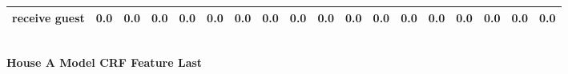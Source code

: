 \documentclass{article}
\begin{document}
\begin{sideways}
\begin{tabular}{lrrrrrrrrrrrrrrrrr}
receive guest                 &         0.0 &                0.0 &           0.0 &               0.0 &                0.0 &                0.0 &              0.0 &                      0.0 &                   0.0 &              0.0 &              0.0 &                            0.0 &                      0.0 &                    0.0 &                                  0.0 &                          0.0 &                  0.0 \\
\bottomrule
\end{tabular}
\end{sideways}
\normalsize
\vspace{1cm}\\
\textbf{House A Model CRF Feature Last}\\
\vspace{1cm}\\
\end{document}
